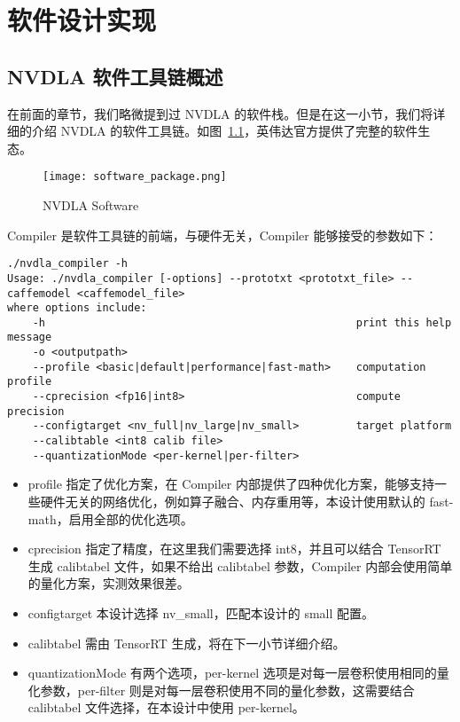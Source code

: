 \chapter{软件设计实现}\label{chap:software}

\section{NVDLA 软件工具链概述}

在前面的章节，我们略微提到过 NVDLA 的软件栈。但是在这一小节，我们将详细的介绍 NVDLA 的软件工具链。如图~\ref{fig:NVDLA Software}，英伟达官方提供了完整的软件生态。

\begin{figure}[!htbp]
    \centering
    \texttt{[image: software\_package.png]}
    \caption{NVDLA Software}
    \label{fig:NVDLA Software}
\end{figure}

Compiler 是软件工具链的前端，与硬件无关，Compiler 能够接受的参数如下：

\begin{lstlisting}
./nvdla_compiler -h
Usage: ./nvdla_compiler [-options] --prototxt <prototxt_file> --caffemodel <caffemodel_file>
where options include:
    -h                                                 print this help message
    -o <outputpath>                                    
    --profile <basic|default|performance|fast-math>    computation profile
    --cprecision <fp16|int8>                           compute precision
    --configtarget <nv_full|nv_large|nv_small>         target platform
    --calibtable <int8 calib file>                     
    --quantizationMode <per-kernel|per-filter>         
\end{lstlisting}

\begin{itemize}
    \item profile 指定了优化方案，在 Compiler 内部提供了四种优化方案，能够支持一些硬件无关的网络优化，例如算子融合、内存重用等，本设计使用默认的 fast-math，启用全部的优化选项。
    \item cprecision 指定了精度，在这里我们需要选择 int8，并且可以结合 TensorRT 生成 calibtabel 文件，如果不给出 calibtabel 参数，Compiler 内部会使用简单的量化方案，实测效果很差。
    \item configtarget 本设计选择 nv\_small，匹配本设计的 small 配置。
    \item calibtabel 需由 TensorRT 生成，将在下一小节详细介绍。
    \item quantizationMode 有两个选项，per-kernel 选项是对每一层卷积使用相同的量化参数，per-filter 则是对每一层卷积使用不同的量化参数，这需要结合 calibtabel 文件选择，在本设计中使用 per-kernel。
\end{itemize}

